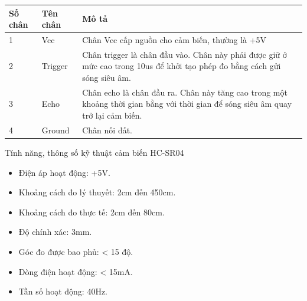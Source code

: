 \documentclass[../DoAn.tex]{subfiles}
\begin{document}
\noindent\begin{minipage}{\linewidth}
\centering
\begin{tabular}{|p{2cm}|p{3cm}|p{10cm}|} 
\hline
\rowcolor[rgb]{1,0.808,0.576} \textbf{Số chân} & \textbf{Tên chân} & \textbf{Mô tả} \\ 
\hline
1 & Vcc & Chân Vcc cấp nguồn cho cảm biến, thường là +5V \\ 
\hline
2 & Trigger & Chân trigger là chân đầu vào. Chân này phải được giữ ở mức cao trong 10us để khởi tạo phép đo bằng cách gửi sóng siêu âm. \\ 
\hline
3 & Echo & Chân echo là chân đầu ra. Chân này tăng cao trong một khoảng thời gian bằng với thời gian để sóng siêu âm quay trở lại cảm biến. \\ 
\hline
4 & Ground & Chân nối đất. \\
\hline
\end{tabular}
\end{minipage}

Tính năng, thông số kỹ thuật cảm biến HC-SR04
\begin{itemize}
    \item Điện áp hoạt động: +5V.
    \item Khoảng cách đo lý thuyết: 2cm đến 450cm.
    \item Khoảng cách đo thực tế: 2cm đến 80cm.
    \item Độ chính xác: 3mm.
    \item Góc đo được bao phủ: < 15 độ.
    \item Dòng điện hoạt động: < 15mA.
    \item Tần số hoạt động: 40Hz.
\end{itemize}
\end{document}
